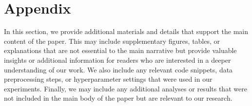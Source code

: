 \section{Appendix}
\label{appendix}
In this section, we provide additional materials and details that support the main content of the paper. This may include supplementary figures, tables, or explanations that are not essential to the main narrative but provide valuable insights or additional information for readers who are interested in a deeper understanding of our work. We also include any relevant code snippets, data preprocessing steps, or hyperparameter settings that were used in our experiments. Finally, we may include any additional analyses or results that were not included in the main body of the paper but are relevant to our research.
